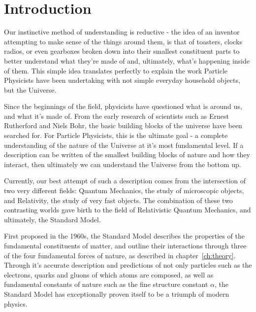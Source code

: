 
\chapter{Introduction}  %

\ifpdf
    \graphicspath{{Chapter1/Figs/Raster/}{Chapter1/Figs/PDF/}{Chapter1/Figs/}}
\else
    \graphicspath{{Chapter1/Figs/Vector/}{Chapter1/Figs/}}
\fi


\label{sec:introduction_intro}

Our instinctive method of understanding is reductive - the idea of an
inventor attempting to make sense of the things around them, is
that of toasters, clocks radios, or even gearboxes broken down into
their smallest constituent parts to better understand what they're made of and,
ultimately, what's happening inside of them. This simple idea translates
perfectly to explain the work Particle Physicists have been undertaking with
not simple everyday household objects, but the Universe.

Since the beginnings of the field, physicists have questioned
what is
around us, and what it's made of. From the early research of scientists such as
Ernest Rutherford and Niels Bohr, the basic building
blocks of the universe have been searched for. For Particle Physicists, this is
the ultimate goal - a complete understanding of the nature of the Universe
at it's most
fundamental level. If a description can be written of the smallest
building blocks of
nature and how they interact, then ultimately we can understand
the Universe from the bottom up.

Currently, our best attempt of such a description comes from the intersection of
two very different
fields: Quantum Mechanics, the study of microscopic objects, and Relativity, the
study of very fast objects. The combination of these
two contrasting worlds gave birth to the field of Relativistic
Quantum Mechanics, and ultimately, the Standard Model.

First proposed in the 1960s, the Standard Model describes the
properties of the fundamental constituents of matter, and outline their
interactions through three of the four fundamental forces of nature, as
described in chapter~\ref{ch:theory}. Through
it's accurate description and predictions of not only particles such as
the electrons, quarks and gluons of which atoms are composed,
as well as fundamental constants of nature such as the fine structure constant
$\alpha$, the
Standard Model has exceptionally proven itself to be a triumph of
modern physics.

